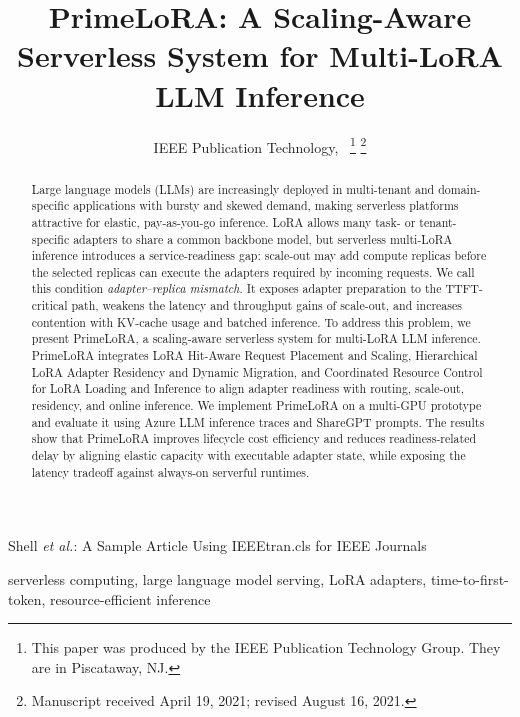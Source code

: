 \documentclass[lettersize,journal]{IEEEtran}
\begin{document}
\title{PrimeLoRA: A Scaling-Aware Serverless System for Multi-LoRA LLM Inference}

\author{IEEE Publication Technology,~
\thanks{This paper was produced by the IEEE Publication Technology Group. They are in Piscataway, NJ.}
\thanks{Manuscript received April 19, 2021; revised August 16, 2021.}}

%
{Shell \MakeLowercase{\textit{et al.}}: A Sample Article Using IEEEtran.cls for IEEE Journals}

\maketitle

\begin{abstract}
Large language models (LLMs) are increasingly deployed in multi-tenant and domain-specific applications with bursty and skewed demand, making serverless platforms attractive for elastic, pay-as-you-go inference. LoRA allows many task- or tenant-specific adapters to share a common backbone model, but serverless multi-LoRA inference introduces a service-readiness gap: scale-out may add compute replicas before the selected replicas can execute the adapters required by incoming requests. We call this condition \emph{adapter--replica mismatch}. It exposes adapter preparation to the TTFT-critical path, weakens the latency and throughput gains of scale-out, and increases contention with KV-cache usage and batched inference. To address this problem, we present PrimeLoRA, a scaling-aware serverless system for multi-LoRA LLM inference. PrimeLoRA integrates LoRA Hit-Aware Request Placement and Scaling, Hierarchical LoRA Adapter Residency and Dynamic Migration, and Coordinated Resource Control for LoRA Loading and Inference to align adapter readiness with routing, scale-out, residency, and online inference. We implement PrimeLoRA on a multi-GPU prototype and evaluate it using Azure LLM inference traces and ShareGPT prompts. The results show that PrimeLoRA improves lifecycle cost efficiency and reduces readiness-related delay by aligning elastic capacity with executable adapter state, while exposing the latency tradeoff against always-on serverful runtimes.
\end{abstract}

\begin{IEEEkeywords}
serverless computing, large language model serving, LoRA adapters, time-to-first-token, resource-efficient inference
\end{IEEEkeywords}
\end{document}
